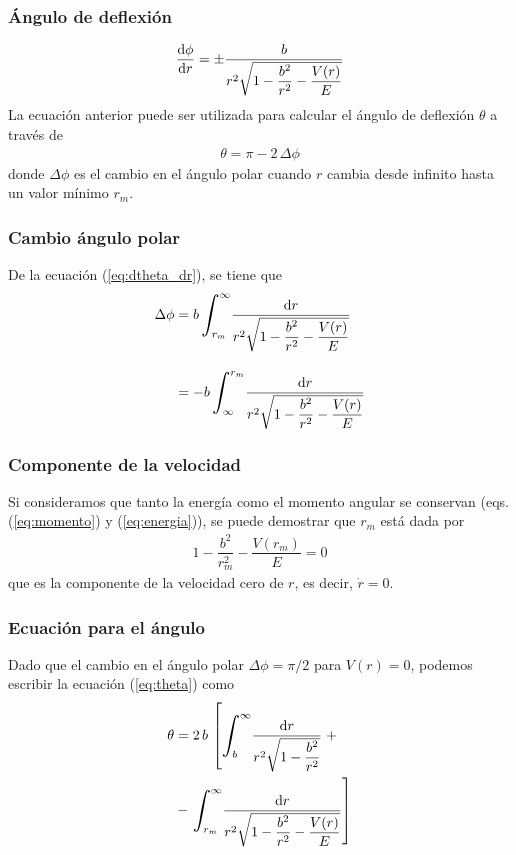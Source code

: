 \begin{frame}
\frametitle{Ángulo de deflexión}
\begin{align*}
\dv{\phi}{r} = \pm \dfrac{b}{r^{2} \sqrt{1 - \dfrac{b^{2}}{r^{2}} - \dfrac{V(r)}{E}}}
\end{align*}
La ecuación anterior puede ser utilizada para calcular el ángulo de deflexión $\theta$ a través de
\begin{align}
\theta = \pi - 2 \, \Delta \phi
\label{eq:theta}
\end{align}
donde $\Delta \phi$ es el cambio en el ángulo polar cuando $r$ cambia desde infinito hasta un valor mínimo $r_{m}$. 
\end{frame}
\begin{frame}
\frametitle{Cambio ángulo polar}
De la ecuación (\ref{eq:dtheta_dr}), se tiene que
\begin{align*}
\Delta \phi &=  b \, \scaleint{7ex}_{\bs r_{m}}^{\infty} \dfrac{\dd{r}}{r^{2} \sqrt{1 - \dfrac{b^{2}}{r^{2}} - \dfrac{V(r)}{E}}} \\[1em]
&= - b \, \scaleint{7ex}_{\bs\infty}^{r_{m}} \dfrac{\dd{r}}{r^{2} \sqrt{1 - \dfrac{b^{2}}{r^{2}} - \dfrac{V(r)}{E}}}
\end{align*}
\end{frame}
\begin{frame}
\frametitle{Componente de la velocidad}
Si consideramos que tanto la energía como el momento angular se conservan (eqs. (\ref{eq:momento}) y (\ref{eq:energia})), se puede demostrar que $r_{m}$ está dada por
\begin{align}
1 - \dfrac{b^{2}}{r_{m}^{2}} - \dfrac{V(r_{m})}{E} = 0
\label{eq:raiz_rm} 
\end{align}
que es la componente de la velocidad cero de $r$, es decir, $\dot{r}=0$.
\end{frame}
\begin{frame}
\frametitle{Ecuación para el ángulo}
Dado que el cambio en el ángulo polar $\Delta \phi = \pi/2$ para $V(r)=0$, podemos escribir la ecuación (\ref{eq:theta}) como
\fontsize{12}{12}\selectfont
\begin{align}
\begin{aligned}
\theta &= 2 \, b \, \left[ \scaleint{7ex}_{\bs b}^{\infty} \dfrac{\dd{r}}{r^{2} \sqrt{1 - \dfrac{b^{2}}{r^{2}}}} \right. + \\
&- \left. \scaleint{7ex}_{\bs r_{m}}^{\infty} \dfrac{\dd{r}}{r^{2} \sqrt{1 - \dfrac{b^{2}}{r^{2}} - \dfrac{V(r)}{E}}} \right]
\end{aligned}
\label{eq:integrales_theta} 
\end{align} 
\end{frame}

